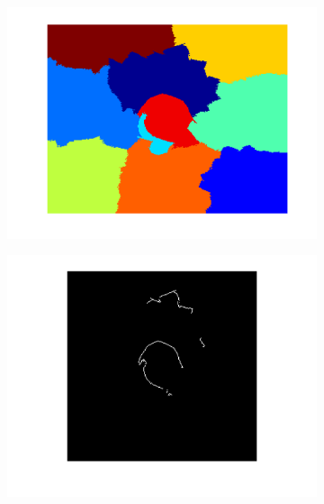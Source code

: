 \documentclass {udthesis}
\begin{document}
\begin{figure}
\begin{subfigure}[]{0.17\textwidth}
      \includegraphics[width=\textwidth,natwidth=1055,natheight=842]{graphimg.pdf}    
      \caption{}
      \label{subfig:graphimg}
  \end{subfigure}
  \begin{subfigure}[]{0.17\textwidth}
      \includegraphics[width=\textwidth,natwidth=834,natheight=837]{regboundry.pdf}
      \caption{}
      \label{subfig:regboundry}
  \end{subfigure}
  \begin{subfigure}[]{0.17\textwidth}

\end{subfigure}
\end{figure}
\end{document}
